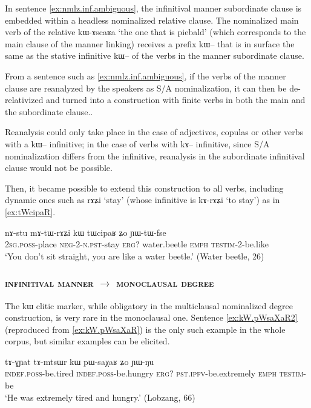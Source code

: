 \documentclass[oldfontcommands,oneside,a4paper,11pt]{article}
\newcommand{\ipa}[1]{{\phon #1}} %
\begin{document}
In sentence \ref{ex:nmlz.inf.ambiguous}, the infinitival manner subordinate clause is embedded within a headless nominalized relative clause. The nominalized main verb of the relative \ipa{kɯ-ɤscaʁa} `the one that is piebald' (which corresponds to the main clause of the manner linking) receives a prefix \ipa{kɯ--} that is in surface the same as the stative infinitive \ipa{kɯ--} of the verbs in the manner subordinate clause.

From a sentence such as \ref{ex:nmlz.inf.ambiguous}, if the verbs of the manner clause are reanalyzed by the speakers as S/A nominalization, it can then be de-relativized and turned into a construction with finite verbs in both the main and the subordinate clause.. 

Reanalysis could only take place in the case of adjectives, copulas or other verbs with a \ipa{kɯ--} infinitive; in the case of verbs with \ipa{kɤ--} infinitive, since S/A nominalization differs from the infinitive, reanalysis in the subordinate infinitival clause would not be possible. 

Then, it became possible to extend this construction to all verbs, including dynamic ones such as \ipa{rɤʑi} `stay' (whose infinitive is \ipa{kɤ-rɤʑi} `to stay') as in \ref{ex:tWcipaR}.

  \begin{exe}
\ex \label{ex:tWcipaR}
\gll 
\ipa{nɤ-stu}  	\ipa{mɤ-tɯ-rɤʑi}  	\ipa{kɯ}  	\ipa{tɯcipaʁ}  	\ipa{ʑo}  	\ipa{ɲɯ-tɯ-fse}  \\
\textsc{2sg.poss}-place \textsc{neg-2-n.pst}-stay \textsc{erg?} water.beetle \textsc{emph} \textsc{testim}-2-be.like \\
\glt `You don't sit straight, you are like a water beetle.'  (Water beetle, 26)
 \end{exe}
 
 
 \subsubsection{ \textsc{infinitival manner} $\rightarrow$  \textsc{monoclausal degree}} \label{sec:manner2adj}
The  \ipa{kɯ} clitic marker, while obligatory in the multiclausal nominalized degree construction, is very rare in the monoclausal one. Sentence \ref{ex:kW.pWsaXaR2}  (reproduced from \ref{ex:kW.pWsaXaR}) is the only such example in the whole corpus, but similar examples can be elicited.

      \begin{exe}
  \ex  \label{ex:kW.pWsaXaR2}  
  \gll 
   \ipa{tɤ-ɣɲat}  	\ipa{tɤ-mtsɯr}  	\ipa{kɯ}  	\ipa{pɯ-saχaʁ}  	\ipa{ʑo}  	\ipa{ɲɯ-ŋu}  \\
      \textsc{indef.poss}-be.tired     \textsc{indef.poss}-be.hungry \textsc{erg?} \textsc{pst.ipfv}-be.extremely \textsc{emph} \textsc{testim}-be \\
      \glt `He was extremely tired and hungry.' (Lobzang, 66)
   \end{exe} 
\end{document}
